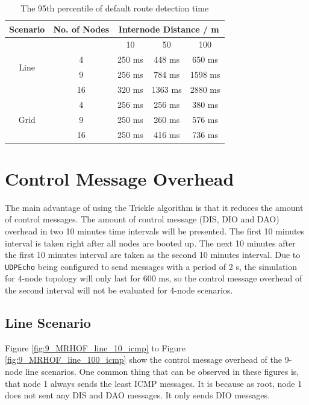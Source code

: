 \begin{table}
\caption{The 95th percentile of default route detection time}
\centering
    \begin{tabular}{ | c | c | c | c | c |} \hline
     \multicolumn{1}{|c|}{Scenario} & No. of Nodes & \multicolumn{3}{|c|}{Internode Distance / m }\\ \hline
     \multicolumn{1}{|c|}{\multirow{4}{*}{Line}} &
     \multicolumn{1}{|c|}{}      & 10      & 50      & 100     \\  \cline{2-5}
     \multicolumn{1}{|c|}{} & 4  & 250 ms  & 448 ms  & 650 ms  \\  \cline{2-5}
     \multicolumn{1}{|c|}{} & 9  & 256 ms  & 784 ms  & 1598 ms \\  \cline{2-5}
     \multicolumn{1}{|c|}{} & 16 & 320 ms  & 1363 ms & 2880 ms \\  \cline{1-5}
     \multicolumn{1}{|c|}{\multirow{4}{*}{Grid}} &
     \multicolumn{1}{|c|}{4}  & 256 ms  & 256 ms  & 380 ms  \\  \cline{2-5}
     \multicolumn{1}{|c|}{} & 9  & 250 ms  & 260 ms  & 576 ms  \\  \cline{2-5}
     \multicolumn{1}{|c|}{} & 16 & 250 ms  & 416 ms  & 736 ms  \\  \cline{1-5}  
    \end{tabular}
  \label{table:95}
\end{table}

\section{Control Message Overhead}
\label{ICMP}
The main advantage of using the Trickle algorithm is that it reduces the amount of control messages. The amount of control message (DIS, DIO and DAO) overhead in two 10 minutes time intervals will be presented. The first 10 minutes interval is taken right after all nodes are booted up. The next 10 minutes after the first 10 minutes interval are taken as the second 10 minutes interval. Due to \texttt{UDPEcho} being configured to send messages with a period of 2 s, the simulation for 4-node topology will only last for 600 ms, so the control message overhead of the second interval will not be evaluated for 4-node scenarios. 

\subsection{Line Scenario}
\label{icmp:line}
Figure \ref{fig:9_MRHOF_line_10_icmp} to Figure \ref{fig:9_MRHOF_line_100_icmp} show the control message overhead  of the 9-node line scenarios. One common thing that can be observed in these figures is, that node 1 always sends the least ICMP messages. It is because as root, node 1 does not sent any DIS and DAO messages. It only sends DIO messages.
\newline

